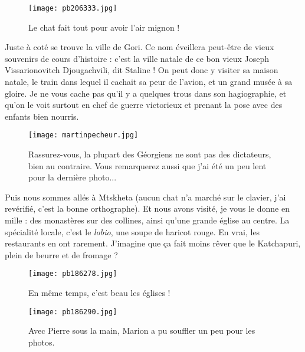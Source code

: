 \documentclass{book}
\begin{document}
\begin{figure}[h]
\centering
\texttt{[image: pb206333.jpg]}
\caption*{Le chat fait tout pour avoir l'air mignon !}
\end{figure}

Juste à coté se trouve la ville de Gori. Ce nom éveillera peut-être de vieux souvenirs de cours d'histoire : c'est la ville natale de ce bon vieux Joseph Vissarionovitch Djougachvili, dit Staline ! On peut donc y visiter sa maison natale, le train dans lequel il cachait sa peur de l'avion, et un grand musée à sa gloire. Je ne vous cache pas qu'il y a quelques trous dans son hagiographie, et qu'on le voit surtout en chef de guerre victorieux et prenant la pose avec des enfants bien nourris.




\begin{figure}[h]
\centering
\texttt{[image: martinpecheur.jpg]}
\caption*{Rassurez-vous, la plupart des Géorgiens ne sont pas des dictateurs, bien au contraire. Vous remarquerez aussi que j'ai été un peu lent pour la dernière photo...}
\end{figure}

Puis nous sommes allés à Mtskheta (aucun chat n'a marché sur le clavier, j'ai revérifié, c'est la bonne orthographe). Et nous avons visité, je vous le donne en mille : des monastères sur des collines, ainsi qu'une grande église au centre. La spécialité locale, c'est le \emph{lobio}, une soupe de haricot rouge. En vrai, les restaurants en ont rarement. J'imagine que ça fait moins rêver que le Katchapuri, plein de beurre et de fromage ?




\begin{figure}[h]
\centering
\texttt{[image: pb186278.jpg]}
\caption*{En même temps, c'est beau les églises !}
\end{figure}


\begin{figure}[h]
\centering
\texttt{[image: pb186290.jpg]}
\caption*{Avec Pierre sous la main, Marion a pu souffler un peu pour les photos.}
\end{figure}
\end{document}
